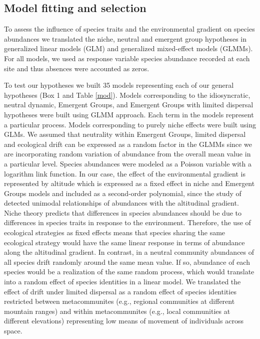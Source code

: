 \documentclass[12pt]{article}
\begin{document}
\subsection*{Model fitting and selection}

To assess the influence of species traits and the environmental gradient on species abundances we translated the niche, neutral and emergent group hypotheses in generalized linear models (GLM) and generalized mixed-effect models (GLMMs). 
For all models, we used as response variable species abundance recorded at each site and thus absences were accounted as zeros. 

To test our hypotheses we built 35 models representing each of our general hypotheses (Box 1 and Table \ref{mod}).
Models corresponding to the idiosyncratic, neutral dynamic, Emergent Groups, and Emergent Groups with limited dispersal hypotheses were built using GLMM approach. Each term in the models represent a particular process. Models corresponding to purely niche effects were built using GLMs. We assumed that neutrality within Emergent Groups, limited dispersal and ecological drift can be expressed as a random factor in the GLMMs since we are incorporating random variation of abundance from the overall mean value in a particular level. 
Species abundances were modeled as a Poisson variable with a logarithm link function. 
In our case, the effect of the environmental gradient is represented by altitude which is expressed as a fixed effect in niche and Emergent Groups models
and included as a second-order polynomial, since the study of \cite{Paciencia2008} detected 
unimodal relationships of abundances with the altitudinal gradient.
Niche theory predicts that differences in species abundances should be due to differences in species traits in response to the environment. Therefore, the use of ecological strategies as fixed effects means that species sharing the same ecological strategy would have the same linear response in terms of abundance along the altitudinal gradient. In contrast, in a neutral community abundances of all species drift randomly around the same mean value. If so, abundance of each species would be a realization of the same random process, which would translate into a random effect of species identities in a linear model. 
We translated the effect of drift under limited dispersal as a random effect of species identities restricted 
between metacommunites (e.g., regional communities at different mountain ranges) and within metacommunites (e.g., local communities at different elevations) representing low means of movement of individuals across space.
\end{document}
